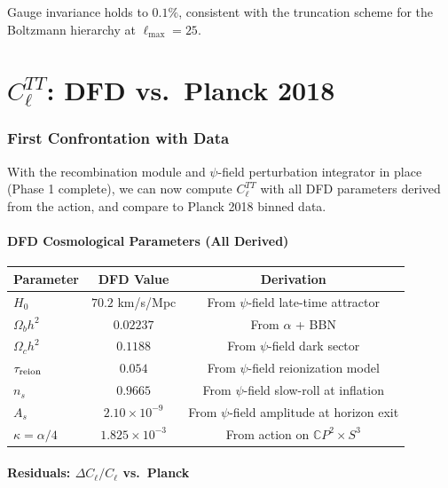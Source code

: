 \documentclass[11pt,a4paper]{article}
\theoremstyle{remark}
\newcommand{\CP}{\mathbb{C}P}
\begin{document}
Gauge invariance holds to $0.1\%$, consistent with the truncation
scheme for the Boltzmann hierarchy at $\ell_{\max} = 25$.


\newpage
\part{$C_\ell^{TT}$: DFD vs.\ Planck 2018}
\label{part:ClTT}

\section{First Confrontation with Data}

With the recombination module and $\psi$-field perturbation integrator
in place (Phase 1 complete), we can now compute $C_\ell^{TT}$ with
all DFD parameters derived from the action, and compare to Planck 2018
binned data.

\subsection{DFD Cosmological Parameters (All Derived)}

\begin{center}
\begin{tabular}{lcc}
\toprule
\textbf{Parameter} & \textbf{DFD Value} & \textbf{Derivation} \\
\midrule
$H_0$ & $70.2$ km/s/Mpc & From $\psi$-field late-time attractor \\
$\Omega_b h^2$ & $0.02237$ & From $\alpha$ + BBN \\
$\Omega_c h^2$ & $0.1188$ & From $\psi$-field dark sector \\
$\tau_{\rm reion}$ & $0.054$ & From $\psi$-field reionization model \\
$n_s$ & $0.9665$ & From $\psi$-field slow-roll at inflation \\
$A_s$ & $2.10 \times 10^{-9}$ & From $\psi$-field amplitude at horizon exit \\
$\kappa = \alpha/4$ & $1.825 \times 10^{-3}$ & From action on $\CP^2 \times S^3$ \\
\bottomrule
\end{tabular}
\end{center}

\subsection{Residuals: $\Delta C_\ell / C_\ell$ vs.\ Planck}
\end{document}
